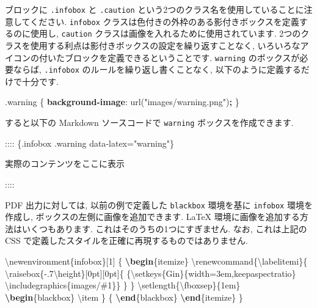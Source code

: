 \documentclass[
  11pt,
]{bxjsreport}
\newenvironment{Shaded}{\begin{snugshade}}{\end{snugshade}}
\newcommand{\BuiltInTok}[1]{#1}
\newcommand{\ExtensionTok}[1]{#1}
\newcommand{\FunctionTok}[1]{\textcolor[rgb]{0.00,0.00,0.00}{#1}}
\newcommand{\KeywordTok}[1]{\textcolor[rgb]{0.13,0.29,0.53}{\textbf{#1}}}
\newcommand{\NormalTok}[1]{#1}
\newcommand{\OperatorTok}[1]{\textcolor[rgb]{0.81,0.36,0.00}{\textbf{#1}}}
\newcommand{\StringTok}[1]{\textcolor[rgb]{0.31,0.60,0.02}{#1}}
\begin{document}
ブロックに \texttt{.infobox} と \texttt{.caution} という2つのクラス名を使用していることに注意してください. \texttt{infobox} クラスは色付きの外枠のある影付きボックスを定義するのに使用し, \texttt{caution} クラスは画像を入れるために使用されています. 2つのクラスを使用する利点は影付きボックスの設定を繰り返すことなく, いろいろなアイコンの付いたブロックを定義できるということです. \texttt{warning} のボックスが必要ならば, \texttt{.infobox} のルールを繰り返し書くことなく, 以下のように定義するだけで十分です.

\begin{Shaded}
\begin{Highlighting}[]
\FunctionTok{.warning}\NormalTok{ \{}
  \KeywordTok{background{-}image}\NormalTok{: }\FunctionTok{url(}\StringTok{"images/warning.png"}\FunctionTok{)}\OperatorTok{;}
\NormalTok{\}}
\end{Highlighting}
\end{Shaded}

すると以下の Markdown ソースコードで \texttt{warning} ボックスを作成できます.

\begin{Shaded}
\begin{Highlighting}[]
\NormalTok{:::: \{.infobox .warning data{-}latex="warning"\}}

\NormalTok{実際のコンテンツをここに表示}

\NormalTok{::::}
\end{Highlighting}
\end{Shaded}

PDF 出力に対しては, 以前の例で定義した \texttt{blackbox} 環境を基に \texttt{infobox} 環境を作成し, ボックスの左側に画像を追加できます. LaTeX 環境に画像を追加する方法はいくつもあります. これはそのうちの1つにすぎません. なお, これは上記の CSS で定義したスタイルを正確に再現するものではありません.

\begin{Shaded}
\begin{Highlighting}[numbers=left,,]
\FunctionTok{\textbackslash{}newenvironment}\NormalTok{\{infobox\}[1]}
\NormalTok{  \{}
  \KeywordTok{\textbackslash{}begin}\NormalTok{\{}\ExtensionTok{itemize}\NormalTok{\}}
  \FunctionTok{\textbackslash{}renewcommand}\NormalTok{\{}\ExtensionTok{\textbackslash{}labelitemi}\NormalTok{\}\{}
    \FunctionTok{\textbackslash{}raisebox}\NormalTok{\{{-}.7}\FunctionTok{\textbackslash{}height}\NormalTok{\}[0pt][0pt]\{}
\NormalTok{      \{}\FunctionTok{\textbackslash{}setkeys}\NormalTok{\{Gin\}\{width=3em,keepaspectratio\}}
        \BuiltInTok{\textbackslash{}includegraphics}\NormalTok{\{}\ExtensionTok{images/\#1}\NormalTok{\}\}}
\NormalTok{    \}}
\NormalTok{  \}}
  \FunctionTok{\textbackslash{}setlength}\NormalTok{\{}\FunctionTok{\textbackslash{}fboxsep}\NormalTok{\}\{1em\}}
  \KeywordTok{\textbackslash{}begin}\NormalTok{\{}\ExtensionTok{blackbox}\NormalTok{\}}
  \FunctionTok{\textbackslash{}item}
\NormalTok{  \}}
\NormalTok{  \{}
  \KeywordTok{\textbackslash{}end}\NormalTok{\{}\ExtensionTok{blackbox}\NormalTok{\}}
  \KeywordTok{\textbackslash{}end}\NormalTok{\{}\ExtensionTok{itemize}\NormalTok{\}}
\NormalTok{  \}}
\end{Highlighting}
\end{Shaded}
\end{document}
